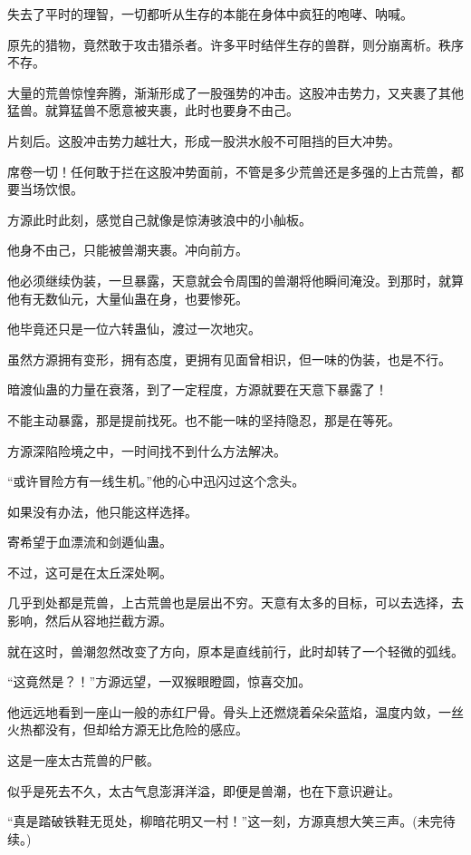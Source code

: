 \begin{this_body}
失去了平时的理智，一切都听从生存的本能在身体中疯狂的咆哮、呐喊。

原先的猎物，竟然敢于攻击猎杀者。许多平时结伴生存的兽群，则分崩离析。秩序不存。

大量的荒兽惊惶奔腾，渐渐形成了一股强势的冲击。这股冲击势力，又夹裹了其他猛兽。就算猛兽不愿意被夹裹，此时也要身不由己。

片刻后。这股冲击势力越壮大，形成一股洪水般不可阻挡的巨大冲势。

席卷一切！任何敢于拦在这股冲势面前，不管是多少荒兽还是多强的上古荒兽，都要当场饮恨。

方源此时此刻，感觉自己就像是惊涛骇浪中的小舢板。

他身不由己，只能被兽潮夹裹。冲向前方。

他必须继续伪装，一旦暴露，天意就会令周围的兽潮将他瞬间淹没。到那时，就算他有无数仙元，大量仙蛊在身，也要惨死。

他毕竟还只是一位六转蛊仙，渡过一次地灾。

虽然方源拥有变形，拥有态度，更拥有见面曾相识，但一味的伪装，也是不行。

暗渡仙蛊的力量在衰落，到了一定程度，方源就要在天意下暴露了！

不能主动暴露，那是提前找死。也不能一味的坚持隐忍，那是在等死。

方源深陷险境之中，一时间找不到什么方法解决。

“或许冒险方有一线生机。”他的心中迅闪过这个念头。

如果没有办法，他只能这样选择。

寄希望于血漂流和剑遁仙蛊。

不过，这可是在太丘深处啊。

几乎到处都是荒兽，上古荒兽也是层出不穷。天意有太多的目标，可以去选择，去影响，然后从容地拦截方源。

就在这时，兽潮忽然改变了方向，原本是直线前行，此时却转了一个轻微的弧线。

“这竟然是？！”方源远望，一双猴眼瞪圆，惊喜交加。

他远远地看到一座山一般的赤红尸骨。骨头上还燃烧着朵朵蓝焰，温度内敛，一丝火热都没有，但却给方源无比危险的感应。

这是一座太古荒兽的尸骸。

似乎是死去不久，太古气息澎湃洋溢，即便是兽潮，也在下意识避让。

“真是踏破铁鞋无觅处，柳暗花明又一村！”这一刻，方源真想大笑三声。(未完待续。)

\end{this_body}

